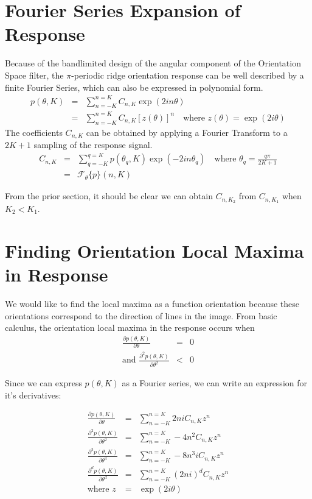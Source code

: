 \documentclass{article}
\begin{document}
\section{Fourier Series Expansion of Response}
Because of the bandlimited design of the angular component of the Orientation Space filter, the $\pi$-periodic ridge orientation response can be well described by a finite Fourier Series, which can also be expressed in polynomial form.
\begin{eqnarray}
    p(\theta,K) & = & \sum_{n=-K}^{n=K} C_{n,K} \exp(2 i n \theta) \\
    & = & \sum_{n=-K}^{n=K} C_{n,K} \left[z(\theta)\right]^n \quad \mbox{where } z(\theta) = \exp(2 i \theta)
\end{eqnarray}
The coefficients $ C_{n,K} $ can be obtained by applying a Fourier Transform to a $ 2K+1 $ sampling of the response signal.
\begin{eqnarray}
    C_{n,K} & = & \sum_{q=-K}^{q=K} p(\theta_q,K) \exp(-2 i n \theta_q) \quad \mbox{where } \theta_q = \frac{q \pi}{2K+1} \\ 
    & = & \mathcal{F}_\theta \{ p \}( n, K)
\end{eqnarray}

From the prior section, it should be clear we can obtain $ C_{n,K_2} $ from $ C_{n,K_1} $ when $ K_2 < K_1 $. 

\section{Finding Orientation Local Maxima in Response}

We would like to find the local maxima as a function orientation because these orientations correspond to the direction of lines in the image. From basic calculus, the orientation local maxima in the response occurs when
\begin{eqnarray}
	\frac{\partial p(\theta,K)}{\partial \theta} & = & 0 \\
	\mbox{and } \frac{\partial^2 p(\theta,K)}{\partial \theta^2} & < & 0
\end{eqnarray}

Since we can express $ p(\theta,K) $ as a Fourier series, we can write an expression for it's derivatives:

\begin{eqnarray}
	\frac{\partial p(\theta,K)}{\partial \theta} & = & \sum_{n=-K}^{n=K} 2 n i C_{n,K} z^n \\
	\frac{\partial^2 p(\theta,K)}{\partial \theta^2} & = & \sum_{n=-K}^{n=K} - 4 n^2 C_{n,K} z^n \\
	\frac{\partial^3 p(\theta,K)}{\partial \theta^3} & = & \sum_{n=-K}^{n=K} - 8 n^3 i C_{n,K} z^n \\
	\frac{\partial^d p(\theta,K)}{\partial \theta^d} & = & \sum_{n=-K}^{n=K} (2ni)^d C_{n,K} z^n \\
	\mbox{where } z & = & \exp(2i\theta)
\end{eqnarray}
\end{document}
